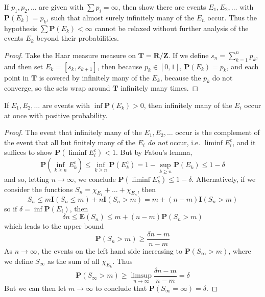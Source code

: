 \begin{exercise}[Tao]
    If $p_1, p_2, \dots$ are given with $\sum p_i = \infty$, then show there are events $E_1, E_2, \dots$ with $\mathbf{P}(E_k) = p_k$, such that almost surely infinitely many of the $E_n$ occur. Thus the hypothesis $\sum \mathbf{P}(E_k) < \infty$ cannot be relaxed without further analysis of the events $E_k$ beyond their probabilities.
\end{exercise}
\begin{proof}
    Take the Haar measure measure on $\mathbf{T} = \mathbf{R}/\mathbf{Z}$. If we define $s_n = \sum_{k = 1}^n p_k$, and then set $E_k = [s_k, s_{k+1}]$, then because $p_k \in [0,1]$, $\mathbf{P}(E_k) = p_k$, and each point in $\mathbf{T}$ is covered by infinitely many of the $E_k$, because the $p_k$ do not converge, so the sets wrap around $\mathbf{T}$ infinitely many times.
\end{proof}

\begin{exercise}[Tao]
    If $E_1, E_2, \dots$ are events with $\inf \mathbf{P}(E_k) > 0$, then infinitely many of the $E_i$ occur at once with positive probability.
\end{exercise}
\begin{proof}
    The event that infinitely many of the $E_1, E_2, \dots$ occur is the complement of the event that all but finitely many of the $E_i$ {\it do not} occur, i.e. $\liminf E_i^c$, and it suffices to show $\mathbf{P}(\liminf E_i^c) < 1$. But by Fatou's lemma,
    \[ \mathbf{P} \left(\inf_{k \geq n} E_k^c \right) \leq \inf_{k \geq n} \mathbf{P}(E_k^c) = 1 - \sup_{k \geq n} \mathbf{P}(E_k) \leq 1 - \delta \]
    and so, letting $n \to \infty$, we conclude $\mathbf{P}(\liminf E_k^c) \leq 1 - \delta$. Alternatively, if we consider the functions $S_n = \chi_{E_1} + \dots + \chi_{E_n}$, then
    \[ S_n \leq m \mathbf{I}(S_n \leq m) + n \mathbf{I}(S_n > m) = m + (n - m) \mathbf{I}(S_n > m) \]
    so if $\delta = \inf \mathbf{P}(E_i)$, then
    \[ \delta n \leq \mathbf{E}(S_n) \leq m + (n - m) \mathbf{P}(S_n > m) \]
    which leads to the upper bound
    \[ \mathbf{P}(S_n > m) \geq \frac{\delta n - m}{n - m} \]
    As $n \to \infty$, the events on the left hand side increasing to $\mathbf{P}(S_\infty > m)$, where we define $S_\infty$ as the sum of all $\chi_{E_k}$. Thus
    \[ \mathbf{P}(S_\infty > m) \geq \limsup_{n \to \infty} \frac{\delta n - m}{n - m} = \delta \]
    But we can then let $m \to \infty$ to conclude that $\mathbf{P}(S_\infty = \infty) = \delta$.
\end{proof}


